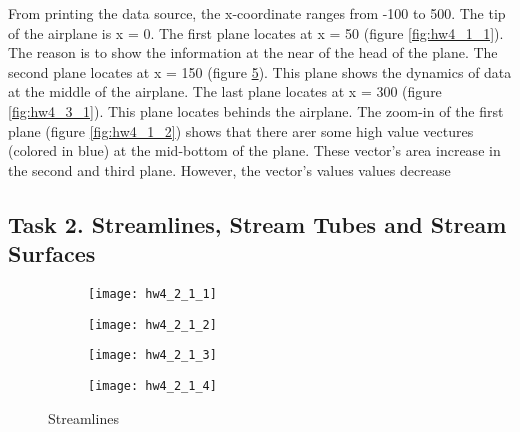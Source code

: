 \documentclass[11pt]{article}
\begin{document}
From printing the data source, the x-coordinate ranges from -100 to 500. The tip of the airplane is x = 0.
The first plane locates at x = 50 (figure \ref{fig:hw4_1_1}). The reason is to show the information at the near of the head of the plane.
The second plane locates at x = 150 (figure \ref{fig:hw4_2_1}). This plane shows the dynamics of data at the middle of the airplane.
The last plane locates at x = 300 (figure \ref{fig:hw4_3_1}). This plane locates behinds the airplane. 
\newline \newline
The zoom-in of the first plane (figure \ref{fig:hw4_1_2}) shows that there arer some high value vectures (colored in blue) at the mid-bottom of the plane. These vector's area increase in the second and third plane. However, the vector's values values decrease


\subsection*{Task 2. Streamlines, Stream Tubes and Stream Surfaces}

\begin{figure}[H]
\begin{subfigure}{.5\textwidth}
  \centering
  \texttt{[image: hw4\_2\_1\_1]}
  \caption{}
  \label{fig:hw4_2_1_1}
\end{subfigure}
\begin{subfigure}{.5\textwidth}
  \centering
  \texttt{[image: hw4\_2\_1\_2]}
  \caption{}
  \label{fig:hw4_2_1_2}
\end{subfigure}

\begin{subfigure}{.5\textwidth}
  \centering
  \texttt{[image: hw4\_2\_1\_3]}
  \caption{}
  \label{fig:hw4_2_1_3}
\end{subfigure}
\begin{subfigure}{.5\textwidth}
  \centering
  \texttt{[image: hw4\_2\_1\_4]}
  \caption{}
  \label{fig:hw4_2_1_4}
\end{subfigure}
\caption{Streamlines}
\label{fig:hw4_2_1}
\end{figure}
\end{document}
